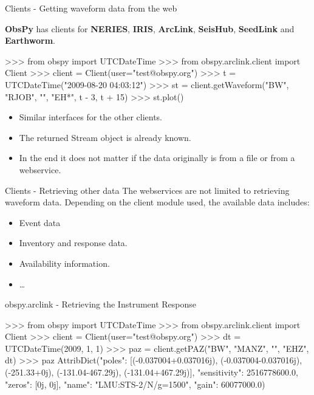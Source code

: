 \documentclass[handout]{beamer}
\begin{document}
\begin{frame}{Clients - Getting waveform data from the web}

    \textbf{ObsPy} has clients for \textbf{NERIES}, \textbf{IRIS}, \textbf{ArcLink}, \textbf{SeisHub}, \textbf{SeedLink} and \textbf{Earthworm}.

\begin{myColorBox}{0.95}{}

\begin{python}
>>> from obspy import UTCDateTime
>>> from obspy.arclink.client import Client
>>> client = Client(user="test@obspy.org")
>>> t = UTCDateTime("2009-08-20 04:03:12")
>>> st = client.getWaveform("BW", "RJOB", "", "EH*",
        t - 3, t + 15)
>>> st.plot()
\end{python}

\end{myColorBox}

\begin{itemize}
    \item Similar interfaces for the other clients.
    \item The returned Stream object is already known.
    \item In the end it does not matter if the data originally is from a file or from a webservice.
\end{itemize}

\end{frame}

\begin{frame}{Clients - Retrieving other data}
    The webservices are not limited to retrieving waveform data. Depending on the client module used, the available data includes:
    \vspace{2em}
    \begin{itemize}
        \item Event data
        \item Inventory and response data.
        \item Availability information.
        \item \dots
    \end{itemize}
\end{frame}


\begin{frame}{obspy.arclink - Retrieving the Instrument Response}
\begin{myColorBox}{0.95}{}
\begin{python}
>>> from obspy import UTCDateTime
>>> from obspy.arclink.client import Client
>>> client = Client(user="test@obspy.org")
>>> dt = UTCDateTime(2009, 1, 1)
>>> paz = client.getPAZ("BW", "MANZ", "", "EHZ", dt)
>>> paz
AttribDict({"poles": [(-0.037004+0.037016j),
                (-0.037004-0.037016j), (-251.33+0j),
                (-131.04-467.29j), (-131.04+467.29j)],
            "sensitivity": 2516778600.0,
            "zeros": [0j, 0j],
            "name": "LMU:STS-2/N/g=1500",
            "gain": 60077000.0})
\end{python}
\end{myColorBox}
\end{frame}
\end{document}
